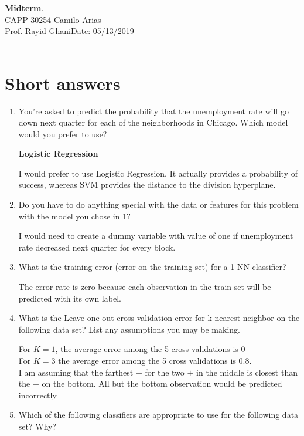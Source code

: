 \documentclass[a4paper, 11pt]{article}
\begin{document}
\noindent
\large\textbf{Midterm}.\\
\normalsize CAPP 30254 \hfill Camilo Arias \\
Prof. Rayid Ghani\hfill Date: 05/13/2019 \\\\

\section*{Short answers}

\begin{enumerate}
\item You’re asked to predict the probability that the unemployment rate will go down next quarter for each of the neighborhoods in Chicago. Which model would you prefer to use?

\textbf{Logistic Regression}

I would prefer to use Logistic Regression. It actually provides a probability of success, whereas SVM provides the distance to the division hyperplane.

\item Do you have to do anything special with the data or features for this problem with the model you chose in 1?

I would need to create a dummy variable with value of one if unemployment rate decreased next quarter for every block. 

\item What is the training error (error on the training set) for a 1-NN classifier?

The error rate is zero because each observation in the train set will be predicted with its own label.

\item What is the Leave-one-out cross validation error for k nearest neighbor on the following data set? List any assumptions you may be making.

For $K = 1$, the average error among the 5 cross validations is 0\\
For $K = 3$ the average error among the 5 cross validations is 0.8.\\
I am assuming that the farthest $-$ for the two $+$ in the middle is closest than the $+$ on the bottom. All but the bottom observation would be predicted incorrectly

\item Which of the following classifiers are appropriate to use for the following data set? Why?


\end{enumerate}
\end{document}
